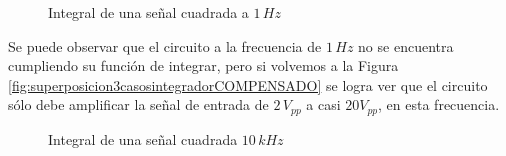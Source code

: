 \documentclass[11pt, a4paper]{article}
\begin{document}
\begin{figure}[H]
	\begin{center}
		\caption{Integral de una señal cuadrada a $1 \, Hz$}
		\label{fig:IntegralCOMP1Hz}
	\end{center}
\end{figure}

Se puede observar que el circuito a la frecuencia de $1 \, Hz$ no se encuentra cumpliendo su función de integrar, pero si volvemos a la Figura \ref{fig:superposicion3casosintegradorCOMPENSADO} se logra ver que el circuito sólo debe amplificar la señal de entrada de $2 \, V_{pp}$ a casi $20 V_{pp}$, en esta frecuencia.

\begin{figure}[H]
	\begin{center}
		\caption{Integral de una señal cuadrada $10 \, kHz$}
		\label{fig:IntegralCOMP10kHz}
	\end{center}
\end{figure}
\end{document}
